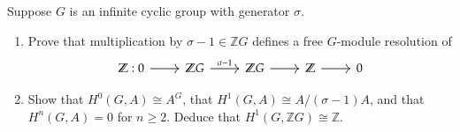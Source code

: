 \documentclass[12pt]{article}
\newenvironment{theorem}{\begin{mytheorem}}{\end{mytheorem}}
\theoremstyle{definitionstyle}
\def\mbb#1{\mathbb{#1}}
\newcommand{\Z}{\mbb Z}
\begin{document}
    \begin{theorem}
        Suppose $G$ is an infinite cyclic group with generator $\sigma$. 
        \begin{enumerate}[label=(\alph*)]
            \item Prove that multiplication by $\sigma-1 \in \Z G$ defines a free $G$-module resolution of 
            \[\begin{tikzcd}
                {\Z: 0} & {\Z G} & {\Z G} & {\Z } & 0
                \arrow[from=1-1, to=1-2]
                \arrow["{\sigma-1}", from=1-2, to=1-3]
                \arrow[from=1-3, to=1-4]
                \arrow[from=1-4, to=1-5]
            \end{tikzcd}\]
            \item Show that $H^0(G,A) \cong A^G$, that $H^1(G, A) \cong A/(\sigma-1)A$, and that $H^n(G, A) = 0$ for $n \geq 2$. Deduce that $H^1(G, \Z G) \cong \Z$.
        \end{enumerate}
    \end{theorem}
    
\end{document}

